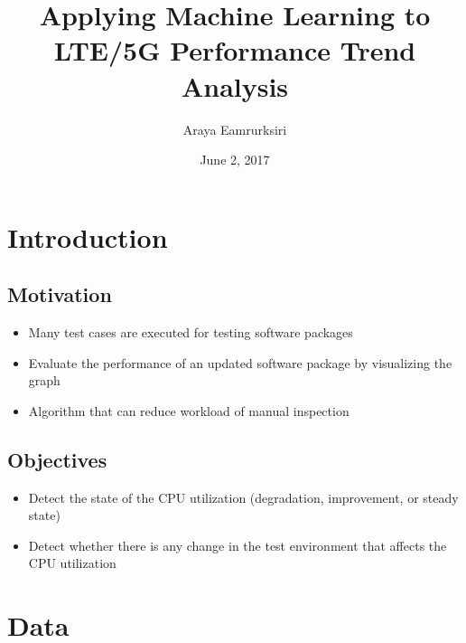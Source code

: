 \documentclass{beamer}
\title[Master Thesis]{Applying Machine Learning to LTE/5G Performance Trend Analysis} %
\author{Araya Eamrurksiri}
\institute[LiU] %
{
	Linkoping university \\ %
	\medskip
	\textit{} %
}
\date{June 2, 2017}
\begin{document}
	
\begin{frame}
	\titlepage %
\end{frame}



\section{Introduction} 
\subsection{Motivation}
\begin{frame}

\begin{itemize}
	\item Many test cases are executed for testing software packages 
	\item Evaluate the performance of an updated software package by visualizing the graph 
	\item Algorithm that can reduce workload of manual inspection
\end{itemize}	

\end{frame}
\subsection{Objectives}
\begin{frame}
\begin{itemize}
	\item Detect the state of the CPU utilization (degradation, improvement, or steady state)
	\item Detect whether there is any change in the test environment that affects the CPU utilization
\end{itemize}
\end{frame}

\section{Data}
\end{document}
